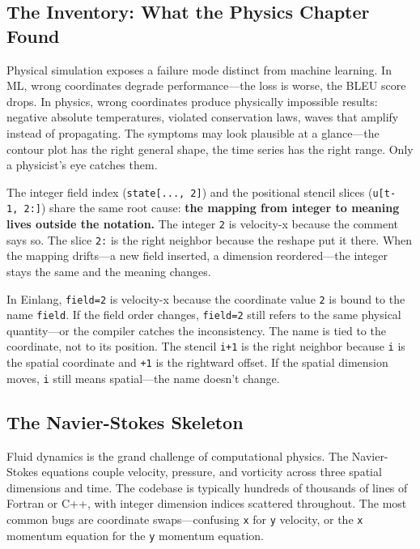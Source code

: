 \documentclass[11pt,titlepage]{article}
\begin{document}
\vspace{2em}

\hypertarget{the-inventory-what-the-physics-chapter-found}{%
\subsection{The Inventory: What the Physics Chapter
Found}\label{the-inventory-what-the-physics-chapter-found}}

Physical simulation exposes a failure mode distinct from machine
learning. In ML, wrong coordinates degrade performance---the loss is
worse, the BLEU score drops. In physics, wrong coordinates produce
physically impossible results: negative absolute temperatures, violated
conservation laws, waves that amplify instead of propagating. The
symptoms may look plausible at a glance---the contour plot has the right
general shape, the time series has the right range. Only a physicist's
eye catches them.

The integer field index (\texttt{state{[}...,\ 2{]}}) and the positional
stencil slices (\texttt{u{[}t-1,\ 2:{]}}) share the same root cause:
\textbf{the mapping from integer to meaning lives outside the notation.}
The integer \texttt{2} is velocity-x because the comment says so. The
slice \texttt{2:} is the right neighbor because the reshape put it
there. When the mapping drifts---a new field inserted, a dimension
reordered---the integer stays the same and the meaning changes.

In Einlang, \texttt{field=2} is velocity-x because the coordinate value
\texttt{2} is bound to the name \texttt{field}. If the field order
changes, \texttt{field=2} still refers to the same physical
quantity---or the compiler catches the inconsistency. The name is tied
to the coordinate, not to its position. The stencil \texttt{i+1} is the
right neighbor because \texttt{i} is the spatial coordinate and
\texttt{+1} is the rightward offset. If the spatial dimension moves,
\texttt{i} still means spatial---the name doesn't change.

\vspace{2em}

\hypertarget{the-navier-stokes-skeleton}{%
\subsection{The Navier-Stokes
Skeleton}\label{the-navier-stokes-skeleton}}

Fluid dynamics is the grand challenge of computational physics. The
Navier-Stokes equations couple velocity, pressure, and vorticity across
three spatial dimensions and time. The codebase is typically hundreds of
thousands of lines of Fortran or C++, with integer dimension indices
scattered throughout. The most common bugs are coordinate
swaps---confusing \texttt{x} for \texttt{y} velocity, or the \texttt{x}
momentum equation for the \texttt{y} momentum equation.
\end{document}
